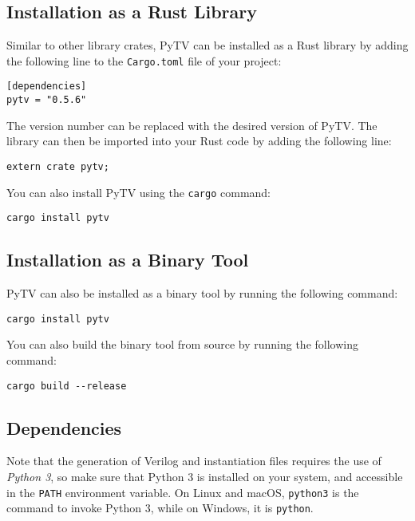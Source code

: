 \subsection{Installation as a Rust Library}
Similar to other library crates, PyTV can be installed as a Rust library by adding the following line to the \texttt{Cargo.toml} file of your project:
\begin{verbatim}
[dependencies]
pytv = "0.5.6"
\end{verbatim}
The version number can be replaced with the desired version of PyTV.
The library can then be imported into your Rust code by adding the following line:
\begin{verbatim}
extern crate pytv;
\end{verbatim}

You can also install PyTV using the \texttt{cargo} command:
\begin{verbatim}
cargo install pytv
\end{verbatim}

\subsection{Installation as a Binary Tool}
PyTV can also be installed as a binary tool by running the following command:
\begin{verbatim}
cargo install pytv
\end{verbatim}

You can also build the binary tool from source by running the following command:
\begin{verbatim}
cargo build --release
\end{verbatim}

\subsection{Dependencies}
Note that the generation of Verilog and instantiation files requires the use of \textit{Python 3},
so make sure that Python 3 is installed on your system, and accessible in the \texttt{PATH} environment variable.
On Linux and macOS, \texttt{python3} is the command to invoke Python 3,
while on Windows, it is \texttt{python}.
